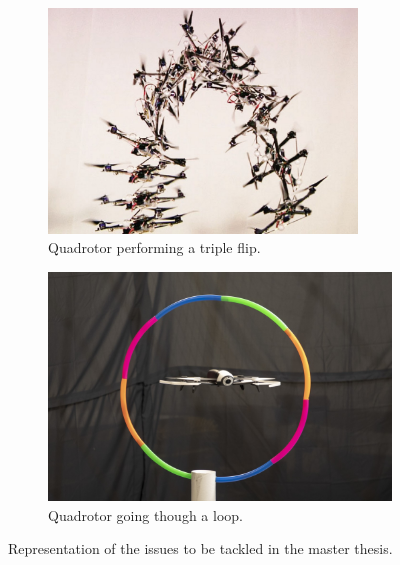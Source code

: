 \documentclass{thesisreport}
\begin{document}
\begin{figure}[h]
     \centering
     \begin{subfigure}[h]{0.45\textwidth}
         \centering
         \includegraphics[width=0.9\textwidth]{Images/Introduction/flip}
    \caption{Quadrotor performing a triple flip.\cite{DAndrea2012}}
         \label{triple_flip}
     \end{subfigure}
     \hfill
     \begin{subfigure}[h]{0.45\textwidth}
         \centering
         \includegraphics[width=\textwidth]{Images/Introduction/constrained_environment}
         \caption[Caption for LOF]{Quadrotor going though a loop.\protect\footnotemark[1]}
         \label{drone_hulahoop}
     \end{subfigure}
        \caption{Representation of the issues to be tackled in the master thesis.}
        \label{fig:three graphs}
\end{figure}
\end{document}
